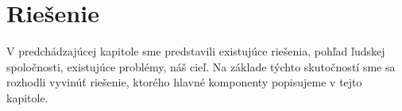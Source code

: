 \section{Riešenie}
V predchádzajúcej kapitole sme predstavili existujúce riešenia, pohľad ľudskej spoločnosti, existujúce problémy, náš cieľ. Na základe týchto skutočností sme sa rozhodli vyvinúť riešenie, ktorého hlavné komponenty popisujeme v tejto kapitole.






